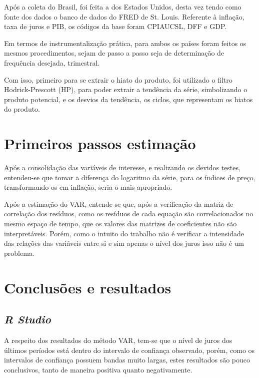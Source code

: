  Ap\'{o}s a coleta do Brasil, foi feita a dos Estados Unidos, desta vez tendo como fonte dos dados o banco de dados do FRED de St. Louis. Referente \`{a} infla\c{c}\~{a}o, taxa de juros e PIB, os c\'{o}digos da base foram CPIAUCSL, DFF e GDP.

 Em termos de instrumentaliza\c{c}\~{a}o pr\'{a}tica, para ambos os pa\'{i}ses foram feitos os mesmos procedimentos, sejam de passo a passo seja de determina\c{c}\~{a}o de frequ\^{e}ncia desejada, trimestral. 


 Com isso, primeiro para se extrair o hiato do produto, foi utilizado o filtro Hodrick-Prescott (HP), para poder extrair a tend\^{e}ncia da s\'{e}rie, simbolizando o produto potencial, e os desvios da tend\^{e}ncia, os ciclos, que representam os hiatos do produto. 

\section*{Primeiros passos estima\c{c}\~{a}o}

\textit{ }Ap\'{o}s a consolida\c{c}\~{a}o das vari\'{a}veis de interesse, e realizando os devidos testes, entendeu-se que tomar a diferen\c{c}a do logaritmo da s\'{e}rie, para os \'{i}ndices de pre\c{c}o, transformando-os em infla\c{c}\~{a}o, seria o mais apropriado. 

 Ap\'{o}s a estima\c{c}\~{a}o do VAR, entende-se que, ap\'{o}s a verifica\c{c}\~{a}o da matriz de correla\c{c}\~{a}o dos res\'{i}duos, como os res\'{i}duos de cada equa\c{c}\~{a}o s\~{a}o correlacionados no mesmo espa\c{c}o de tempo, que os valores das matrizes de coeficientes n\~{a}o s\~{a}o interpret\'{a}veis. Por\'{e}m, como o intuito do trabalho n\~{a}o \'{e} verificar a intensidade das rela\c{c}\~{o}es das vari\'{a}veis entre si e sim apenas o n\'{i}vel dos juros isso n\~{a}o \'{e} um problema. 

\section*{Conclus\~{o}es e resultados }

\subsection*{\textit{R Studio}}

A respeito dos resultados do m\'{e}todo VAR, tem-se que o n\'{i}vel de juros dos \'{u}ltimos per\'{i}odos est\'{a} dentro do intervalo de confian\c{c}a observado, por\'{e}m, como os intervalos de confian\c{c}a possuem bandas muito largas, estes resultados s\~{a}o pouco conclusivos, tanto de maneira positiva quanto negativamente.

